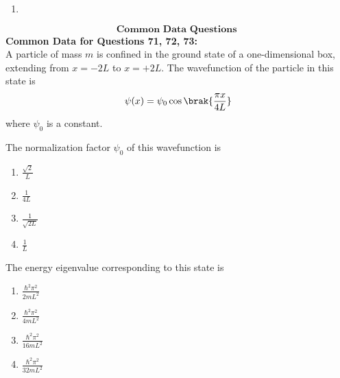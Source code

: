 \begin{enumerate}
        
        \item \begin{figure}[H]

%
\label{fig:my_label}
\end{figure}


    \end{enumerate}



  $$\textbf{Common Data Questions }$$  
\textbf{Common Data for Questions 71, 72, 73:} \\
A particle of mass $m$ is confined in the ground state of a one-dimensional box, extending from $x = -2L$ to $x = +2L$. The wavefunction of the particle in this state is 
\begin{align*}
    \psi(x) = \psi_0 \cos\brak{\frac{\pi x}{4L}}
\end{align*}
where $\psi_0$ is a constant.

    \item The normalization factor $\psi_0$ of this wavefunction is 
    \begin{multicols}{4}
        \begin{enumerate}
            \item $\frac{\sqrt{2}}{L}$
            \item $\frac{1}{4L}$
            \item $\frac{1}{\sqrt{2L}}$
            \item $\frac{1}{L}$
        \end{enumerate}
    \end{multicols}

\item The energy eigenvalue corresponding to this state is 
\begin{multicols}{4}
 \begin{enumerate}
    \item $\frac{\hbar^2 \pi^2}{2mL^2}$
    \item $\frac{\hbar^2 \pi^2}{4mL^2}$
    \item $\frac{\hbar^2 \pi^2}{16mL^2}$
    \item $\frac{\hbar^2 \pi^2}{32mL^2}$
\end{enumerate}
\end{multicols}

